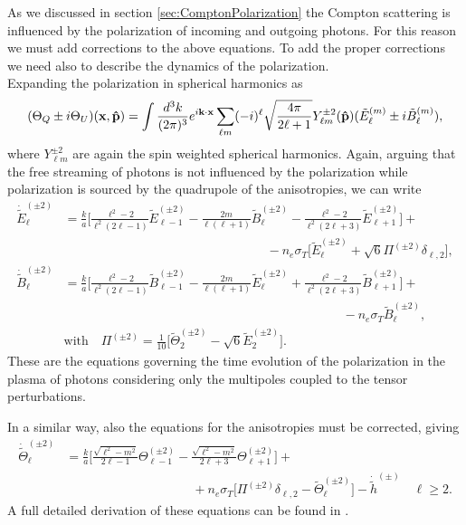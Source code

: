 As we discussed in section \ref{sec:ComptonPolarization} the Compton scattering is influenced by the polarization of incoming and outgoing photons. For this reason we must add corrections to the above equations.
To add the proper corrections we need also to describe the dynamics of the polarization.\\ Expanding the polarization in spherical harmonics as 
\begin{equation}
    (\Theta_Q\pm i\Theta_U)(\mathbf{x,\mathbf{\hat{p}}})=\int\frac{d^3k}{(2\pi)^3}e^{i\mathbf{k}\cdot\mathbf{x}}\sum_{\ell m} (-i)^{\ell}\sqrt{\frac{4\pi}{2\ell+1}}Y^{\pm2}_{\ell m}(\mathbf{\hat{p}})(\tilde E_{\ell}^{(m)}\pm i\tilde B_\ell^{(m)}) ,\label{eq:EB_multipole_expansion_tensor}
\end{equation}
where $Y^{\pm2}_{\ell m}$ are again the spin weighted spherical harmonics. Again, arguing that the free streaming of photons is not influenced by the polarization while polarization is sourced by the quadrupole of the anisotropies, we can write
\begin{subequations}\label{eq:EB_multipole_equations_tensor}
    \begin{align}
        \dot{\tilde E}_\ell^{(\pm2)}&=\frac{k}{a}\bigg[\frac{\ell^2-2}{\ell^2(2\ell-1)}\tilde E_{\ell-1}^{(\pm2)}-\frac{2m}{\ell(\ell+1)}\tilde B_\ell^{(\pm2)}-\frac{\ell^2-2}{\ell^2(2\ell+3)}\tilde E_{\ell+1}^{(\pm2)}\bigg]+\nonumber\\&\qquad\qquad\qquad\qquad\qquad\qquad\qquad\qquad-n_e\sigma_T\bigg[\tilde E_{\ell}^{(\pm2)}+\sqrt{6}\Pi^{(\pm2)}\delta_{\ell,2}\bigg],\label{eq:E_multipole_equation_tensor}\\
        \dot{\tilde B}_\ell^{(\pm2)}&=\frac{k}{a}\bigg[\frac{\ell^2-2}{\ell^2(2\ell-1)}\tilde B_{\ell-1}^{(\pm2)}-\frac{2m}{\ell(\ell+1)}\tilde E_\ell^{(\pm2)}+\frac{\ell^2-2}{\ell^2(2\ell+3)}\tilde B_{\ell+1}^{(\pm2)}\bigg]+\nonumber\\&\qquad\qquad\qquad\qquad\qquad\qquad\qquad\qquad\qquad\qquad\qquad-n_e\sigma_T\tilde B_{\ell}^{(\pm2)},\label{eq:B_multipole_equation_tensor}\\
        \nonumber &\text{with}\quad\Pi^{(\pm2)}=\frac{1}{10}\bigg[\tilde\Theta_2^{(\pm2)}-\sqrt{6}\tilde E_2^{(\pm2)}\bigg].
    \end{align}
\end{subequations}
These are the equations governing the time evolution of the polarization in the plasma of photons considering only the multipoles coupled to the tensor perturbations.

In a similar way, also the equations for the anisotropies must be corrected, giving
\begin{align}\label{eq:Theta_multipole_equation_tensor}
    \dot{\tilde\Theta}_\ell^{(\pm2)}&=\frac{k}{a}\bigg[\frac{\sqrt{\ell^2-m^2}}{2\ell-1}\Theta_{\ell-1}^{(\pm2)}-\frac{\sqrt{\ell^2-m^2}}{2\ell+3}\Theta_{\ell+1}^{(\pm2)}\bigg]+\nonumber\\&\qquad\qquad\qquad\qquad\qquad+n_e\sigma_T\bigg[\Pi^{(\pm2)}\delta_{\ell,2}-\tilde\Theta_{\ell}^{(\pm2)}\bigg]-\dot{\tilde h}^{(\pm)}\quad \ell\geq2.
\end{align}
A full detailed derivation of these equations can be found in \cite{HuWhite}.

